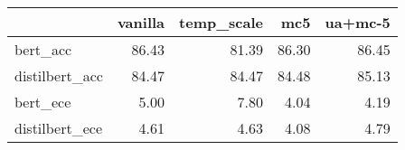 \begin{tabular}{lrrrr}
\toprule
{} &  vanilla &  temp\_scale &    mc5 &  ua+mc-5 \\
\midrule
bert\_acc       &    86.43 &       81.39 &  86.30 &    86.45 \\
distilbert\_acc &    84.47 &       84.47 &  84.48 &    85.13 \\
bert\_ece       &     5.00 &        7.80 &   4.04 &     4.19 \\
distilbert\_ece &     4.61 &        4.63 &   4.08 &     4.79 \\
\bottomrule
\end{tabular}
